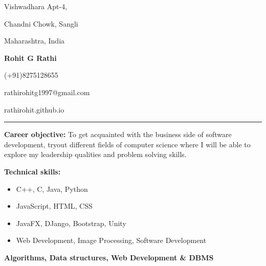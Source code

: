 \documentclass[11pt]{article}
\begin{document}
	\begin{center}
		\begin{minipage}[b]{0.33333\textwidth}
			\raggedright
			Vishwadhara Apt-4,\par
			Chandni Chowk, Sangli\par
			Maharashtra, India
		\end{minipage}%
		\begin{minipage}[b]{0.33333\textwidth}
			\centering
			\begin{huge}
				\textbf{Rohit G Rathi}
			\end{huge}
		\end{minipage}%
		\begin{minipage}[b]{0.33333\textwidth}
			\raggedleft
			(+91)8275128655\par
			rathirohitg1997@gmail.com\par
			rathirohit.github.io\par
		\end{minipage}%
		\bigskip
		\hrule
		\vspace{0.5cm}
		\begin{minipage}[t]{1\textwidth}
			\raggedright\smallskip
			\begin{LARGE}
				\textbf{Career objective:}\medskip\linebreak%
				{\small To get acquainted with the business side of software development, tryout different fields of computer science where I will be able to explore my leadership qualities and problem solving skills.}\linebreak%
			\end{LARGE}
		\end{minipage}%
		\vspace{0.3cm}
		\begin{minipage}[t]{0.35\textwidth}
			\raggedright\smallskip
			\begin{LARGE}
				\textbf{Technical skills:}\medskip%
				{\small
					\begin{itemize}
						\item C++, C, Java, Python
						\item JavaScript, HTML, CSS
						\item JavaFX, DJango, Bootstrap, Unity
						\item Web Development, Image Processing, Software Development
					\end{itemize}
				}
				\small \textbf{Algorithms, Data structures, Web Development \& DBMS}
			\end{LARGE}
			\\\vspace{0.85cm}

\end{minipage}
\end{center}
\end{document}
